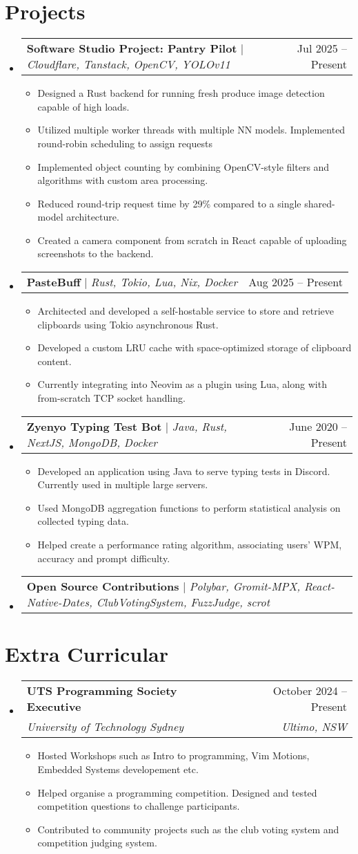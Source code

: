 \documentclass[letterpaper,11pt]{article}
\makeatletter
\newcommand{\resumeItem}[1]{
  \item\small{
    {#1 \vspace{-2pt}}
  }
}
\newcommand{\resumeSubheading}[4]{
  \vspace{-2pt}\item
    \begin{tabular*}{0.97\textwidth}[t]{l@{\extracolsep{\fill}}r}
      \textbf{#1} & #2 \\
      \textit{\small#3} & \textit{\small #4} \\
    \end{tabular*}\vspace{-7pt}
}
\newcommand{\resumeProjectHeading}[2]{
    \item
    \begin{tabular*}{0.97\textwidth}{l@{\extracolsep{\fill}}r}
      \small#1 & #2 \\
    \end{tabular*}\vspace{-7pt}
}
\newcommand{\resumeSubHeadingListStart}{\begin{itemize}[leftmargin=0.15in, label={}]}
\newcommand{\resumeSubHeadingListEnd}{\end{itemize}}
\newcommand{\resumeItemListStart}{\begin{itemize}}
\newcommand{\resumeItemListEnd}{\end{itemize}\vspace{-5pt}}
\makeatother
\begin{document}
\section{Projects}
    \resumeSubHeadingListStart
      \resumeProjectHeading
          {\textbf{Software Studio Project: Pantry Pilot} $|$ \emph{Cloudflare, Tanstack, OpenCV, YOLOv11}}{Jul 2025 -- Present}
          \resumeItemListStart
            \resumeItem{Designed a Rust backend for running fresh produce image detection capable of high loads.}
            \resumeItem{Utilized multiple worker threads with multiple NN models. Implemented round-robin scheduling to assign requests}
            \resumeItem{Implemented object counting by combining OpenCV-style filters and algorithms with custom area processing.}
            \resumeItem{Reduced round-trip request time by 29\% compared to a single shared-model architecture.}
            \resumeItem{Created a camera component from scratch in React capable of uploading screenshots to the backend.}
          \resumeItemListEnd
      \resumeProjectHeading
          {\textbf{PasteBuff} $|$ \emph{Rust, Tokio, Lua, Nix, Docker}}{Aug 2025 -- Present}
          \resumeItemListStart
            \resumeItem{Architected and developed a self-hostable service to store and retrieve clipboards using Tokio asynchronous Rust.}
            \resumeItem{Developed a custom LRU cache with space-optimized storage of clipboard content.}
            \resumeItem{Currently integrating into Neovim as a plugin using Lua, along with from-scratch TCP socket handling.}
          \resumeItemListEnd
      \resumeProjectHeading
          {\textbf{Zyenyo Typing Test Bot} $|$ \emph{Java, Rust, NextJS, MongoDB, Docker}}{June 2020 -- Present}
          \resumeItemListStart
            \resumeItem{Developed an application using Java to serve typing tests in Discord. Currently used in multiple large servers.}
            \resumeItem{Used MongoDB aggregation functions to perform statistical analysis on collected typing data.}
            \resumeItem{Helped create a performance rating algorithm, associating users' WPM, accuracy and prompt difficulty.}
          \resumeItemListEnd
      \resumeProjectHeading
          {\textbf{Open Source Contributions} $|$ \emph{Polybar, Gromit-MPX, React-Native-Dates, ClubVotingSystem, FuzzJudge, scrot}}{}
    \resumeSubHeadingListEnd


\section{Extra Curricular}
    \resumeSubHeadingListStart
    \resumeSubheading
      {UTS Programming Society Executive}{October 2024 -- Present}
      {University of Technology Sydney}{Ultimo, NSW}
      \resumeItemListStart
        \resumeItem{Hosted Workshops such as Intro to programming, Vim Motions, Embedded Systems developement etc. }
        \resumeItem{Helped organise a programming competition. Designed and tested competition questions to challenge participants.}
        \resumeItem{Contributed to community projects such as the club voting system and competition judging system.}
      \resumeItemListEnd
    \resumeSubHeadingListEnd
\end{document}
